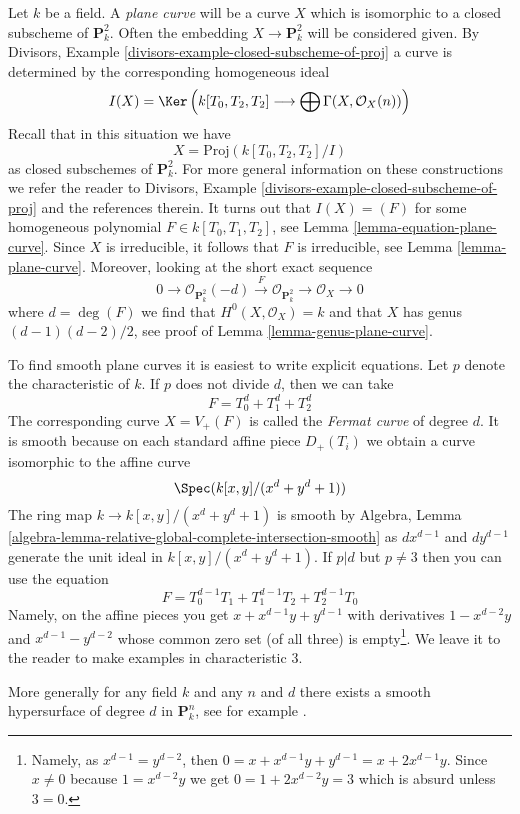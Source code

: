 \noindent
Let $k$ be a field. A {\it plane curve} will be a curve $X$ which is isomorphic
to a closed subscheme of $\mathbf{P}^2_k$. Often the embedding
$X \to \mathbf{P}^2_k$ will be considered given. By
Divisors, Example \ref{divisors-example-closed-subscheme-of-proj}
a curve is determined by the corresponding homogeneous ideal
$$
I(X) =
\Ker\left(
k[T_0, T_2, T_2] \longrightarrow \bigoplus \Gamma(X, \mathcal{O}_X(n))
\right)
$$
Recall that in this situation we have
$$
X = \text{Proj}(k[T_0, T_2, T_2]/I)
$$
as closed subschemes of $\mathbf{P}^2_k$.
For more general information on these constructions we refer the
reader to Divisors, Example \ref{divisors-example-closed-subscheme-of-proj}
and the references therein.
It turns out that $I(X) = (F)$ for some homogeneous polynomial
$F \in k[T_0, T_1, T_2]$, see Lemma \ref{lemma-equation-plane-curve}.
Since $X$ is irreducible, it follows that $F$ is irreducible, see
Lemma \ref{lemma-plane-curve}. Moreover, looking at the short exact
sequence
$$
0 \to \mathcal{O}_{\mathbf{P}^2_k}(-d) \xrightarrow{F}
\mathcal{O}_{\mathbf{P}^2_k} \to \mathcal{O}_X \to 0
$$
where $d = \deg(F)$ we find that $H^0(X, \mathcal{O}_X) = k$ and that $X$
has genus $(d - 1)(d - 2)/2$, see proof of Lemma \ref{lemma-genus-plane-curve}.

\medskip\noindent
To find smooth plane curves it is easiest to write explicit
equations. Let $p$ denote the characteristic of $k$. If $p$
does not divide $d$, then we can take
$$
F = T_0^d + T_1^d + T_2^d
$$
The corresponding curve $X = V_+(F)$ is called the
{\it Fermat curve} of degree $d$. It is smooth because
on each standard affine piece $D_+(T_i)$ we obtain
a curve isomorphic to the affine curve
$$
\Spec(k[x, y]/(x^d + y^d + 1))
$$
The ring map $k \to k[x, y]/(x^d + y^d + 1)$ is smooth by
Algebra, Lemma \ref{algebra-lemma-relative-global-complete-intersection-smooth}
as $d x^{d - 1}$ and $d y^{d - 1}$ generate the unit ideal
in $k[x, y]/(x^d + y^d + 1)$. If $p | d$ but $p \not = 3$
then you can use the equation
$$
F = T_0^{d - 1}T_1 + T_1^{d - 1}T_2 + T_2^{d - 1}T_0
$$
Namely, on the affine pieces you get $x + x^{d - 1}y + y^{d - 1}$
with derivatives $1 - x^{d - 2}y$ and $x^{d - 1} - y^{d - 2}$
whose common zero set (of all three) is empty\footnote{Namely,
as $x^{d - 1} = y^{d - 2}$, then $0 = x + x^{d - 1}y + y^{d - 1} =
x + 2 x^{d - 1} y$. Since $x \not = 0$ because $1 = x^{d - 2}y$
we get $0 = 1 + 2x^{d - 2}y = 3$ which is absurd unless $3 = 0$.}.
We leave it to the reader to make examples in characteristic $3$.

\medskip\noindent
More generally for any field $k$ and any $n$ and $d$ there exists
a smooth hypersurface of degree $d$ in $\mathbf{P}^n_k$, see
for example \cite{Poonen}.

